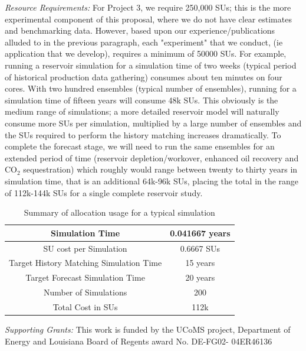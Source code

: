 \documentclass[a4paper,10pt]{article}
\begin{document}

{\it Resource Requirements:} For Project 3, we require 250,000 SUs; this is the more experimental component of this proposal, where we do not have clear estimates and benchmarking data. However, based upon our experience/publications alluded to in the previous paragraph, each "experiment" that we conduct, (ie application that we develop), requires a minimum of 50000 SUs. For example, running a reservoir simulation for a simulation
time of two weeks (typical period of historical production data gathering) consumes about ten minutes on four cores. 
With two hundred ensembles (typical number of ensembles), running for a simulation time of fifteen years will consume
48k SUs. This obviously is the medium range of simulations; a more detailed reservoir model
will naturally consume more SUs per simulation, multiplied by a large number of ensembles and the SUs required
to perform the history matching increases dramatically. To complete the forecast stage, we will need to run
the same ensembles for an extended period of time (reservoir depletion/workover, enhanced oil recovery and
CO$_2$ sequestration) which roughly would range between twenty to thirty years in simulation time, that is
an additional 64k-96k SUs, placing the total in the range of 112k-144k SUs for a single complete reservoir study.

\begin{table}[!h]
\begin{center}
 \caption{Summary of allocation usage for a typical simulation}
\begin{tabular}{| c | c |}
\hline
Simulation Time & 0.041667 years \\ 
\hline
SU cost per Simulation & 0.6667 SUs \\ 
\hline
Target History Matching Simulation Time & 15 years \\ 
\hline
Target Forecast Simulation Time & 20 years \\ 
\hline
Number of Simulations & 200 \\ 
\hline
Total Cost in SUs & 112k\\
\hline
\end{tabular}
\end{center}
\end{table}


{\it Supporting Grants:} This work is funded by the UCoMS project, Department of Energy and Louisiana Board of Regents
award No. DE-FG02- 04ER46136 
\end{document}
